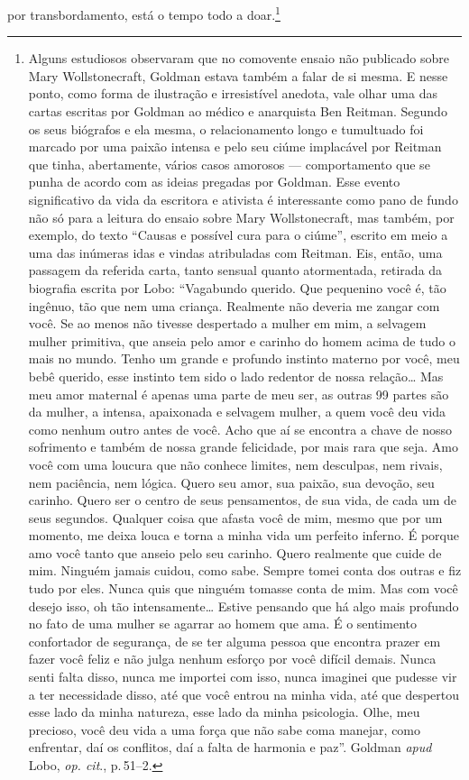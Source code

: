 por transbordamento, está o tempo todo a doar.\footnote{Alguns
  estudiosos observaram que no comovente ensaio não publicado sobre Mary
  Wollstonecraft, Goldman estava também a falar de si
  mesma. E nesse ponto, como forma de ilustração e irresistível anedota,
  vale olhar uma das cartas escritas por Goldman ao médico e
  anarquista Ben Reitman. Segundo os seus biógrafos e ela mesma, o
  relacionamento longo e tumultuado foi marcado por uma paixão intensa
  e pelo seu ciúme implacável por Reitman que
  tinha, abertamente, vários casos amorosos --- comportamento que se
  punha de acordo com as ideias pregadas por Goldman. Esse evento
  significativo da vida da escritora e ativista é 
  interessante como pano de fundo não só para a leitura do
  ensaio sobre Mary Wollstonecraft, mas também, por exemplo, do texto
  ``Causas e possível cura para o ciúme'', escrito em meio a
  uma das inúmeras idas e vindas atribuladas com Reitman. Eis, então,
  uma passagem da referida carta, tanto sensual quanto atormentada,
  retirada da biografia escrita por Lobo: ``Vagabundo querido. Que
  pequenino você é, tão ingênuo, tão que nem uma criança. Realmente não
  deveria me zangar com você. Se ao menos não tivesse despertado a
  mulher em mim, a selvagem mulher primitiva, que anseia pelo amor e
  carinho do homem acima de tudo o mais no mundo. Tenho um grande e
  profundo instinto materno por você, meu bebê querido, esse instinto
  tem sido o lado redentor de nossa relação\ldots{} Mas meu amor maternal é
  apenas uma parte de meu ser, as outras 99 partes são da mulher, a
  intensa, apaixonada e selvagem mulher, a quem você deu vida como
  nenhum outro antes de você. Acho que aí se encontra a chave de nosso
  sofrimento e também de nossa grande felicidade, por mais rara que
  seja. Amo você com uma loucura que não conhece limites, nem desculpas,
  nem rivais, nem paciência, nem lógica. Quero seu amor, sua paixão, sua
  devoção, seu carinho. Quero ser o centro de seus pensamentos, de sua
  vida, de cada um de seus segundos. Qualquer coisa que afasta você de
  mim, mesmo que por um momento, me deixa louca e torna a minha vida um
  perfeito inferno. É porque amo você tanto que anseio pelo seu carinho.
  Quero realmente que cuide de mim. Ninguém jamais cuidou, como sabe.
  Sempre tomei conta dos outras e fiz tudo por eles. Nunca quis que
  ninguém tomasse conta de mim. Mas com você desejo isso, oh tão
  intensamente\ldots{} Estive pensando que há algo mais profundo no fato de
  uma mulher se agarrar ao homem que ama. É o sentimento confortador de
  segurança, de se ter alguma pessoa que encontra prazer em fazer você
  feliz e não julga nenhum esforço por você difícil demais. Nunca senti
  falta disso, nunca me importei com isso, nunca imaginei que pudesse
  vir a ter necessidade disso, até que você entrou na minha vida, até
  que despertou esse lado da minha natureza, esse lado da minha
  psicologia. Olhe, meu precioso, você deu vida a uma força que não sabe
  coma manejar, como enfrentar, daí os conflitos, daí a falta de
  harmonia e paz''. Goldman \emph{apud} Lobo, \textit{op. cit}., p.\,51--2.}


